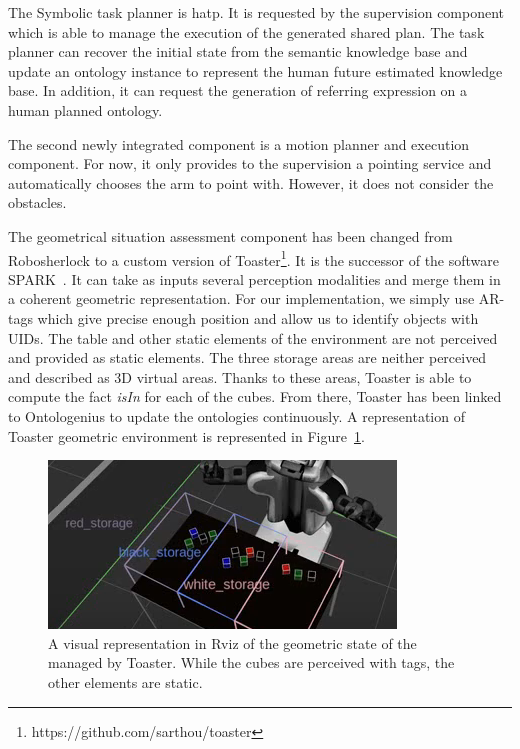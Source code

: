The Symbolic task planner is \acrshort{hatp}. It is requested by the supervision component which is able to manage the execution of the generated shared plan. The task planner can recover the initial state from the semantic knowledge base and update an ontology instance to represent the human future estimated knowledge base. In addition, it can request the generation of referring expression on a human planned ontology.

The second newly integrated component is a motion planner and execution component. For now, it only provides to the supervision a pointing service and automatically chooses the arm to point with. However, it does not consider the obstacles.

The geometrical situation assessment component has been changed from Robosherlock to a custom version of Toaster\footnote{https://github.com/sarthou/toaster}. It is the successor of the software SPARK~\cite{milliez_2014_framework}. It can take as inputs several perception modalities and merge them in a coherent geometric representation. For our implementation, we simply use AR-tags which give precise enough position and allow us to identify objects with UIDs. The table and other static elements of the environment are not perceived and provided as static elements. The three storage areas are neither perceived and described as 3D virtual areas. Thanks to these areas, Toaster is able to compute the fact \textit{isIn} for each of the cubes. From there, Toaster has been linked to Ontologenius to update the ontologies continuously. A representation of Toaster geometric environment is represented in Figure~\ref{fig:chap5_toaster}.

\begin{figure}[!ht]
\centering
\includegraphics[scale=0.70]{figures/chapter5/toaster.png}
\caption{\label{fig:chap5_toaster} A visual representation in Rviz of the geometric state of the managed by Toaster. While the cubes are perceived with tags, the other elements are static.
 }
\end{figure}


